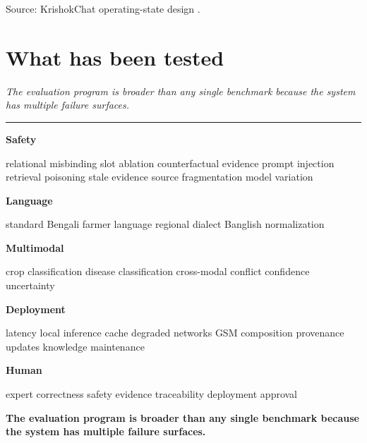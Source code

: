 \documentclass[11pt,a4paper]{article}
\newcommand{\takeaway}[1]{{\color{kcgrey}\itshape\large #1}\par\vspace{2pt}%
  {\color{kcline}\rule{\linewidth}{0.8pt}}\par\vspace{6pt}}
\newcommand{\srcfoot}[1]{\par\vspace{4pt}{\color{kcline}\rule{\linewidth}{0.4pt}}\par
  {\footnotesize\color{kcgrey}#1}\par}
\begin{document}
\srcfoot{Source: KrishokChat operating-state design \cite{cea_manuscript,krishokchat_repo}.}

\newpage
\section*{\color{kcgreen}What has been tested}
\takeaway{The evaluation program is broader than any single benchmark because the system has multiple failure surfaces.}

\begin{minipage}[t]{0.48\linewidth}
\textbf{\color{kcgreen}Safety}\par\footnotesize
relational misbinding \textbullet{} slot ablation \textbullet{} counterfactual
evidence \textbullet{} prompt injection \textbullet{} retrieval poisoning
\textbullet{} stale evidence \textbullet{} source fragmentation \textbullet{}
model variation

\vspace{5pt}
\textbf{\color{kcgreen}Language}\par\footnotesize
standard Bengali \textbullet{} farmer language \textbullet{} regional dialect
\textbullet{} Banglish \textbullet{} normalization

\vspace{5pt}
\textbf{\color{kcgreen}Multimodal}\par\footnotesize
crop classification \textbullet{} disease classification \textbullet{} cross-modal
conflict \textbullet{} confidence uncertainty
\end{minipage}\hfill
\begin{minipage}[t]{0.48\linewidth}
\textbf{\color{kcgreen}Deployment}\par\footnotesize
latency \textbullet{} local inference \textbullet{} cache \textbullet{} degraded
networks \textbullet{} GSM composition \textbullet{} provenance updates
\textbullet{} knowledge maintenance

\vspace{5pt}
\textbf{\color{kcgreen}Human}\par\footnotesize
expert correctness \textbullet{} safety \textbullet{} evidence traceability
\textbullet{} deployment approval
\end{minipage}

\vspace{6pt}
\begin{pullquote}
{\bfseries\color{kcgreen}The evaluation program is broader than any single benchmark because the system has multiple failure surfaces.}
\end{pullquote}
\end{document}
